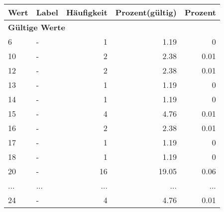      \begin{longtable}{lXrrr}
     \toprule
     \textbf{Wert} & \textbf{Label} & \textbf{Häufigkeit} & \textbf{Prozent(gültig)} & \textbf{Prozent} \\
     \endhead
     \midrule
     \multicolumn{5}{l}{\textbf{Gültige Werte}}\\
        6 & \multicolumn{1}{X}{-} & %
          \num{1} &
          \num[round-mode=places,round-precision=2]{1,19} &
          \num[round-mode=places,round-precision=2]{0} \\
        10 & \multicolumn{1}{X}{-} & %
          \num{2} &
          \num[round-mode=places,round-precision=2]{2,38} &
          \num[round-mode=places,round-precision=2]{0,01} \\
        12 & \multicolumn{1}{X}{-} & %
          \num{2} &
          \num[round-mode=places,round-precision=2]{2,38} &
          \num[round-mode=places,round-precision=2]{0,01} \\
        13 & \multicolumn{1}{X}{-} & %
          \num{1} &
          \num[round-mode=places,round-precision=2]{1,19} &
          \num[round-mode=places,round-precision=2]{0} \\
        14 & \multicolumn{1}{X}{-} & %
          \num{1} &
          \num[round-mode=places,round-precision=2]{1,19} &
          \num[round-mode=places,round-precision=2]{0} \\
        15 & \multicolumn{1}{X}{-} & %
          \num{4} &
          \num[round-mode=places,round-precision=2]{4,76} &
          \num[round-mode=places,round-precision=2]{0,01} \\
        16 & \multicolumn{1}{X}{-} & %
          \num{2} &
          \num[round-mode=places,round-precision=2]{2,38} &
          \num[round-mode=places,round-precision=2]{0,01} \\
        17 & \multicolumn{1}{X}{-} & %
          \num{1} &
          \num[round-mode=places,round-precision=2]{1,19} &
          \num[round-mode=places,round-precision=2]{0} \\
        18 & \multicolumn{1}{X}{-} & %
          \num{1} &
          \num[round-mode=places,round-precision=2]{1,19} &
          \num[round-mode=places,round-precision=2]{0} \\
        20 & \multicolumn{1}{X}{-} & %
          \num{16} &
          \num[round-mode=places,round-precision=2]{19,05} &
          \num[round-mode=places,round-precision=2]{0,06} \\
       ... & ... & ... & ... & ... \\
        24 & \multicolumn{1}{X}{-} & %
          \num{4} &
          \num[round-mode=places,round-precision=2]{4,76} &
          \num[round-mode=places,round-precision=2]{0,01} \\


\end{longtable}
